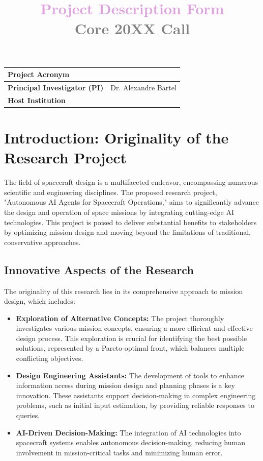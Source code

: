 \documentclass[a4paper, 11pt]{article}
\title{\bf \textcolor{Plum}{Project Description Form} \\ \textcolor{Gray}{Core 20XX Call}}
\author{\vspace{-5ex}}
\date{\vspace{-5ex}}
\begin{document}
\vspace{10cm}
\maketitle

\begin{center}
\begin{tabular}{|p{4.5cm}|p{}|}
\hline
\bf Project Acronym  &  \\ \hline
\bf Principal Investigator (PI)  &  Dr. Alexandre Bartel \\ \hline
\bf Host Institution  & \\ \hline
\end{tabular}
\end{center}

\newpage
\section{Introduction: Originality of the Research Project}

The field of spacecraft design is a multifaceted endeavor, encompassing numerous scientific and engineering disciplines. The proposed research project, "Autonomous AI Agents for Spacecraft Operations," aims to significantly advance the design and operation of space missions by integrating cutting-edge AI technologies. This project is poised to deliver substantial benefits to stakeholders by optimizing mission design and moving beyond the limitations of traditional, conservative approaches.

\subsection{Innovative Aspects of the Research}

The originality of this research lies in its comprehensive approach to mission design, which includes:

\begin{itemize}
    \item \textbf{Exploration of Alternative Concepts:} The project thoroughly investigates various mission concepts, ensuring a more efficient and effective design process. This exploration is crucial for identifying the best possible solutions, represented by a Pareto-optimal front, which balances multiple conflicting objectives.
    \item \textbf{Design Engineering Assistants:} The development of tools to enhance information access during mission design and planning phases is a key innovation. These assistants support decision-making in complex engineering problems, such as initial input estimation, by providing reliable responses to queries.
    \item \textbf{AI-Driven Decision-Making:} The integration of AI technologies into spacecraft systems enables autonomous decision-making, reducing human involvement in mission-critical tasks and minimizing human error.
\end{itemize}
\end{document}
